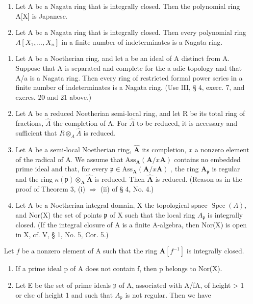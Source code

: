 \begin{enumerate}
\def\labelenumi{\alph{enumi})}
\setcounter{enumi}{1}
\item
  Let A be a Nagata ring that is integrally closed. Then the polynomial ring A{[}X{]} is Japanese.
\item
  Let A be a Nagata ring that is integrally closed. Then every polynomial ring \(A[X_1, \ldots, X_n]\) in a finite number of indeterminates is a Nagata ring.
\end{enumerate}

\begin{enumerate}
\def\labelenumi{\arabic{enumi})}
\setcounter{enumi}{21}
\item
  Let A be a Noetherian ring, and let a be an ideal of A distinct from A. Suppose that A is separated and complete for the a-adic topology and that A/a is a Nagata ring. Then every ring of restricted formal power series in a finite number of indeterminates is a Nagata ring. (Use III, § 4, exerc. 7, and exercs. 20 and 21 above.)
\item
  Let A be a reduced Noetherian semi-local ring, and let R be its total ring of fractions, \(\hat{A}\) the completion of A. For \(\hat{A}\) to be reduced, it is necessary and sufficient that \(R \otimes_{A} \hat{A}\) is reduced.
\item
  Let A be a semi-local Noetherian ring, \(\hat{\mathbf{A}}\) its completion, \(x\) a nonzero element of the radical of A. We assume that \(\mathrm{Ass}_{\mathbf{A}}(\mathbf{A}/x\mathbf{A})\) contains no embedded prime ideal and that, for every \(\mathfrak{p} \in \mathrm{Ass}_{\mathbf{A}}(\mathbf{A}/x\mathbf{A})\) , the ring \(\mathbf{A}_{\mathfrak{p}}\) is regular and the ring \(\kappa(\mathfrak{p}) \otimes_{\mathbf{A}} \hat{\mathbf{A}}\) is reduced. Then \(\hat{\mathbf{A}}\) is reduced. (Reason as in the proof of Theorem 3, (i) \(\Rightarrow\) (ii) of § 4, No. 4.)
\item
  Let A be a Noetherian integral domain, X the topological space \(\operatorname{Spec}(A)\), and Nor(X) the set of points \(\mathfrak{p}\) of X such that the local ring \(A_{\mathfrak{p}}\) is integrally closed. (If the integral closure of A is a finite A-algebra, then Nor(X) is open in X, cf. V, § 1, No. 5, Cor. 5.)
\end{enumerate}

Let \(f\) be a nonzero element of A such that the ring \(\mathbf{A}[f^{-1}]\) is integrally closed.

\begin{enumerate}
\def\labelenumi{\alph{enumi})}
\item
  If a prime ideal p of A does not contain f, then p belongs to Nor(X).
\item
  Let E be the set of prime ideals \(\mathfrak{p}\) of A, associated with A/fA, of height \textgreater{} 1 or else of height 1 and such that \(A_{\mathfrak{p}}\) is not regular. Then we have
\end{enumerate}

